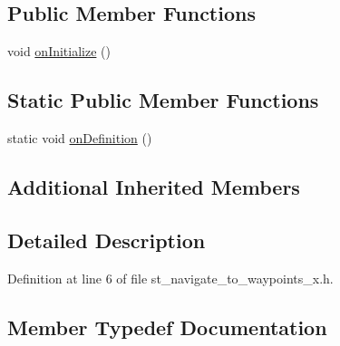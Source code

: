\subsection*{Public Member Functions}
\begin{DoxyCompactItemize}
\item 
void \hyperlink{structsm__dance__bot_1_1StNavigateToWaypointsX_a5954a62667839c5b56ff07ebd26541d7}{on\+Initialize} ()
\end{DoxyCompactItemize}
\subsection*{Static Public Member Functions}
\begin{DoxyCompactItemize}
\item 
static void \hyperlink{structsm__dance__bot_1_1StNavigateToWaypointsX_abfa4eb3045794e95b79852f0c328b03e}{on\+Definition} ()
\end{DoxyCompactItemize}
\subsection*{Additional Inherited Members}


\subsection{Detailed Description}


Definition at line 6 of file st\+\_\+navigate\+\_\+to\+\_\+waypoints\+\_\+x.\+h.



\subsection{Member Typedef Documentation}
